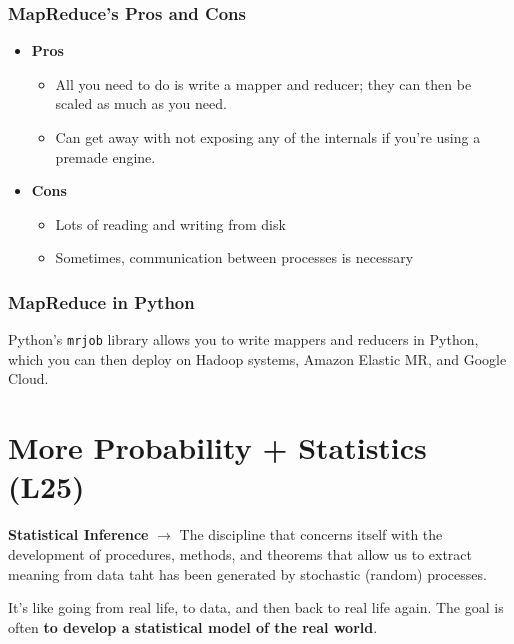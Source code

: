 \documentclass[english, 10pt]{article}
\begin{document}
\subsubsection{MapReduce's Pros and Cons}

\begin{itemize}
	\item \textbf{Pros}
	\begin{itemize}
		\item All you need to do is write a mapper and reducer; they can then be scaled as much as you need.
		\item Can get away with not exposing any of the internals if you're using a premade engine.
	\end{itemize}
	\item \textbf{Cons}
	\begin{itemize}
		\item Lots of reading and writing from disk
		\item Sometimes, communication between processes is necessary
	\end{itemize}
\end{itemize}

\subsubsection{MapReduce in Python}

Python's \texttt{mrjob} library allows you to write mappers and reducers in Python, which you can then deploy on Hadoop systems, Amazon Elastic MR, and Google Cloud.

\section{More Probability + Statistics (L25)}

\begin{tcolorbox}[title=Definition:,colframe=red!75!black,colback=red!5!white,arc=0pt,fonttitle=\bfseries]
\textbf{Statistical Inference} $\rightarrow$ The discipline that concerns itself with the development of procedures, methods, and theorems that allow us to extract meaning from data taht has been generated by stochastic (random) processes.
\end{tcolorbox}

\hfill \break It's like going from real life, to data, and then back to real life again. The goal is often \textbf{to develop a statistical model of the real world}.\\
\end{document}
